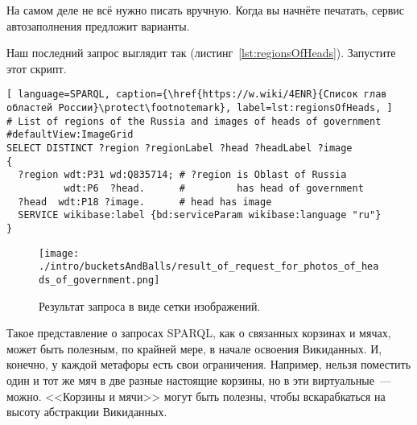 На самом деле не всё нужно писать вручную. Когда вы начнёте печатать, сервис автозаполнения предложит варианты.

Наш последний запрос выглядит так (листинг~\ref{lst:regionsOfHeads}). Запустите этот скрипт.

\begin{lstlisting}[ language=SPARQL, caption={\href{https://w.wiki/4ENR}{Список глав областей России}\protect\footnotemark}, label=lst:regionsOfHeads, ]
# List of regions of the Russia and images of heads of government
#defaultView:ImageGrid
SELECT DISTINCT ?region ?regionLabel ?head ?headLabel ?image
{
  ?region wdt:P31 wd:Q835714; # ?region is Oblast of Russia
          wdt:P6  ?head.      #         has head of government
  ?head  wdt:P18 ?image.      # head has image
  SERVICE wikibase:label {bd:serviceParam wikibase:language "ru"} 
}
\end{lstlisting}


\begin{figure*}[h!]
\texttt{[image: ./intro/bucketsAndBalls/result\_of\_request\_for\_photos\_of\_heads\_of\_government.png]}
\caption{Результат запроса в виде сетки изображений.}
\end{figure*}


Такое представление о запросах SPARQL, как о связанных корзинах и мячах, может быть полезным, по крайней мере, в начале освоения Викиданных. И, конечно, у каждой метафоры есть свои ограничения. Например, нельзя поместить один и тот же мяч в две разные настоящие корзины, но в эти виртуальные~--- можно. <<Корзины и мячи>> могут быть полезны, чтобы вскарабкаться на высоту абстракции Викиданных.
